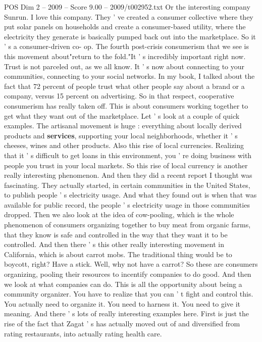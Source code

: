 \begin{textsample}{POS Dim 2 – 2009 – Score 9.00 – 2009/t002952.txt}
Or the interesting company Sunrun.
I love this company.
They ' ve created a consumer collective where they put solar panels on households and create a consumer-based utility, where the electricity they generate is basically pumped back out into the marketplace.
So it ' s a consumer-driven co- op.
The fourth post-crisis consumerism that we see is this movement about"return to the fold."It ' s incredibly important right now.
Trust is not parceled out, as we all know.
It ' s now about connecting to your communities, connecting to your social networks.
In my book, I talked about the fact that 72 percent of people trust what other people say about a brand or a company, versus 15 percent on advertising.
So in that respect, cooperative consumerism has really taken off.
This is about consumers working together to get what they want out of the marketplace.
Let ' s look at a couple of quick examples.
The artisanal movement is huge : everything about locally derived products and \textbf{services}, supporting your local neighborhoods, whether it ' s cheeses, wines and other products.
Also this rise of local currencies.
Realizing that it ' s difficult to get loans in this environment, you ' re doing business with people you trust in your local markets.
So this rise of local currency is another really interesting phenomenon.
And then they did a recent report I thought was fascinating.
They actually started, in certain communities in the United States, to publish people ' s electricity usage.
And what they found out is when that was available for public record, the people ' s electricity usage in those communities dropped.
Then we also look at the idea of cow-pooling, which is the whole phenomenon of consumers organizing together to buy meat from organic farms, that they know is safe and controlled in the way that they want it to be controlled.
And then there ' s this other really interesting movement in California, which is about carrot mobs.
The traditional thing would be to boycott, right?
Have a stick.
Well, why not have a carrot?
So these are consumers organizing, pooling their resources to incentify companies to do good.
And then we look at what companies can do.
This is all the opportunity about being a community organizer.
You have to realize that you can ' t fight and control this.
You actually need to organize it.
You need to harness it.
You need to give it meaning.
And there ' s lots of really interesting examples here.
First is just the rise of the fact that Zagat ' s has actually moved out of and diversified from rating restaurants, into actually rating health care.

\end{textsample}
